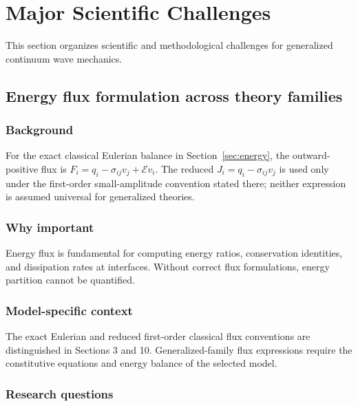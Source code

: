 \section{Major Scientific Challenges}
\label{sec:challenges}

This section organizes scientific and methodological challenges for generalized continuum wave mechanics.

\subsection{Energy flux formulation across theory families}
\label{sec:15.1}

\subsubsection{Background}

For the exact classical Eulerian balance in Section~\ref{sec:energy}, the outward-positive flux is $F_i=q_i-\sigma_{ij}v_j+\mathcal{E}v_i$. The reduced $J_i=q_i-\sigma_{ij}v_j$ is used only under the first-order small-amplitude convention stated there; neither expression is assumed universal for generalized theories.

\subsubsection{Why important}

Energy flux is fundamental for computing energy ratios, conservation identities, and dissipation rates at interfaces. Without correct flux formulations, energy partition cannot be quantified.

\subsubsection{Model-specific context}

The exact Eulerian and reduced first-order classical flux conventions are distinguished in Sections 3 and 10. Generalized-family flux expressions require the constitutive equations and energy balance of the selected model.

\subsubsection{Research questions}

